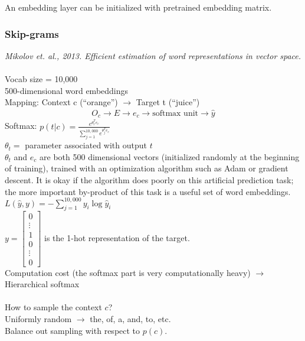 An embedding layer can be initialized with pretrained embedding matrix.
\subsubsection{Skip-grams}
\textit{Mikolov et. al., 2013. Efficient estimation of word representations in vector space.}\\
\\
Vocab size = 10,000\\
500-dimensional word embeddings\\
Mapping: Context c (``orange'') $\rightarrow$ Target t (``juice'')
\begin{align}
O_c \rightarrow E \rightarrow e_c \rightarrow \text{softmax unit} \rightarrow \hat{y}
\end{align}
Softmax: $\displaystyle p(t|c) = \frac{e^{\theta_t^T e_c}}{\sum_{j=1}^{10,000}e^{\theta_j^T e_c}}$\\
$\displaystyle \theta_t = $ parameter associated with output $t$\\
$\theta_t$ and $e_c$ are both 500 dimensional vectors (initialized randomly at the beginning of training), trained with an optimization algorithm such as Adam or gradient descent. It is okay if the algorithm does poorly on this artificial prediction task; the more important by-product of this task is a useful set of word embeddings.\\
$\displaystyle L(\hat{y}, y) = - \sum_{j=1}^{10,000}y_i \log \hat{y}_i$\\
$y = \begin{bmatrix}
0\\ \vdots \\ 1 \\ 0 \\ \vdots \\ 0
\end{bmatrix}$ is the 1-hot representation of the target.\\
Computation cost (the softmax part is very computationally heavy) $\rightarrow$ Hierarchical softmax\\
\\
How to sample the context $c$?\\
Uniformly random $\rightarrow$ the, of, a, and, to, etc.\\
Balance out sampling with respect to $p(c)$.

